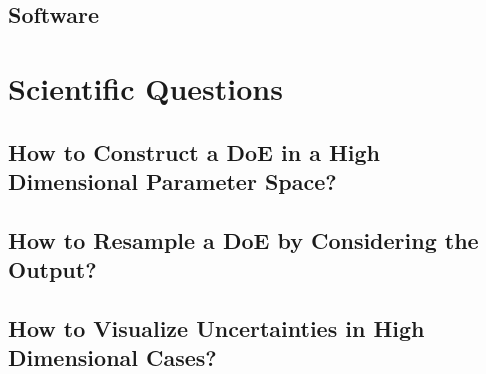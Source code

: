 \section{Software}\label{sec:software}



\chapter{Scientific Questions}


\section{How to Construct a DoE in a High Dimensional Parameter Space?}

\section{How to Resample a DoE by Considering the Output?}

\section{How to Visualize Uncertainties in High Dimensional Cases?}
